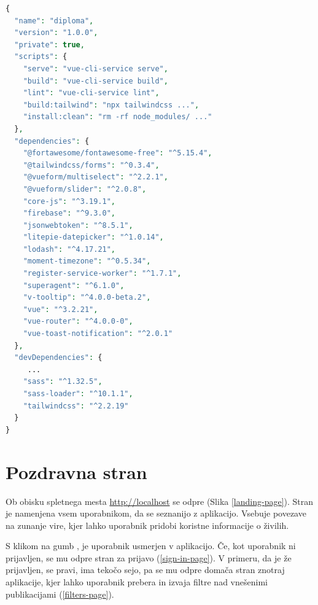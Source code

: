 \documentclass[a4paper, 12pt]{book}
\begin{document}
\begin{lstlisting}[language=php, style=mystyle,caption={Izsek naštetih knjižnic in ukazov v datoteki package.json},label=lst:pkg-snippet]
{
  "name": "diploma",
  "version": "1.0.0",
  "private": true,
  "scripts": {
    "serve": "vue-cli-service serve",
    "build": "vue-cli-service build",
    "lint": "vue-cli-service lint",
    "build:tailwind": "npx tailwindcss ...",
    "install:clean": "rm -rf node_modules/ ..."
  },
  "dependencies": {
    "@fortawesome/fontawesome-free": "^5.15.4",
    "@tailwindcss/forms": "^0.3.4",
    "@vueform/multiselect": "^2.2.1",
    "@vueform/slider": "^2.0.8",
    "core-js": "^3.19.1",
    "firebase": "^9.3.0",
    "jsonwebtoken": "^8.5.1",
    "litepie-datepicker": "^1.0.14",
    "lodash": "^4.17.21",
    "moment-timezone": "^0.5.34",
    "register-service-worker": "^1.7.1",
    "superagent": "^6.1.0",
    "v-tooltip": "^4.0.0-beta.2",
    "vue": "^3.2.21",
    "vue-router": "^4.0.0-0",
    "vue-toast-notification": "^2.0.1"
  },
  "devDependencies": {
     ...
    "sass": "^1.32.5",
    "sass-loader": "^10.1.1",
    "tailwindcss": "^2.2.19"
  }
}

\end{lstlisting}

\section{Pozdravna stran}
Ob obisku spletnega mesta \url{http://localhost} se odpre  (Slika \ref{landing-page}). Stran je namenjena vsem uporabnikom, da se seznanijo z aplikacijo. Vsebuje povezave na zunanje vire, kjer lahko uporabnik pridobi koristne informacije o živilih. 

S klikom na gumb , je uporabnik usmerjen v aplikacijo. Če, kot uporabnik ni prijavljen, se mu odpre stran za prijavo (\ref{sign-in-page}). V primeru, da je že prijavljen, se pravi, ima tekočo sejo, pa se mu odpre domača stran znotraj aplikacije, kjer lahko uporabnik prebera in izvaja filtre nad vnešenimi publikacijami (\ref{filters-page}).
\end{document}
